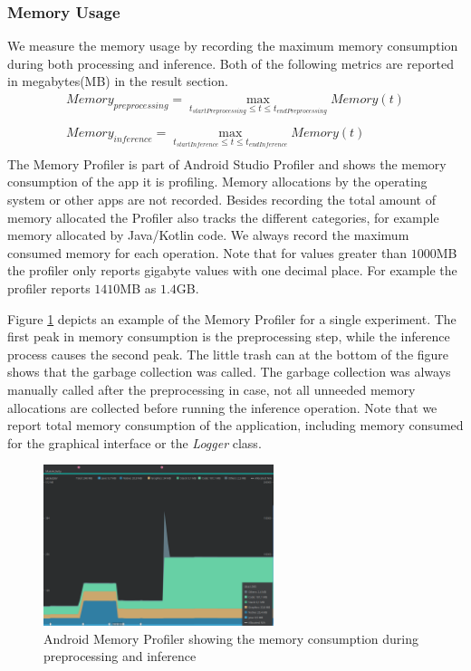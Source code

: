 \subsubsection{Memory Usage}
We measure the memory usage by recording the maximum memory consumption during both processing and inference. Both of the following metrics are reported in megabytes(MB) in the result section.
\begin{equation*}
\begin{gathered}
Memory_{preprocessing} = \max\limits_{t_{startPreprocessing} \leq t \leq t_{endPreprocessing}} Memory(t)\\\\
Memory_{inference} = \max\limits_{t_{startInference} \leq t \leq t_{endInference}} Memory(t)\\
\end{gathered}
\end{equation*}
The Memory Profiler is part of Android Studio Profiler and shows the memory consumption of the app it is profiling. Memory allocations by the operating system or other apps are not recorded. Besides recording the total amount of memory allocated the Profiler also tracks the different categories, for example memory allocated by Java/Kotlin code. We always record the maximum consumed memory for each operation.
Note that for values greater than $1000$MB the profiler only reports gigabyte values with one decimal place. For example the profiler reports $1410$MB as $1.4$GB.

Figure \ref{fig:prof_mem} depicts an example of the Memory Profiler for a single experiment. The first peak in memory consumption is the preprocessing step, while the inference process causes the second peak.
The little trash can at the bottom of the figure shows that the garbage collection was called. The garbage collection was always manually called after the preprocessing in case, not all unneeded memory allocations are collected before running the inference operation. 
Note that we report total memory consumption of the application, including memory consumed for the graphical interface or the \emph{Logger} class.
\begin{figure}[H]
\centering
\includegraphics[width=0.6\textwidth]{./Bilder/profiler_MEM}
\caption{Android Memory Profiler showing the memory consumption during preprocessing and inference}
\label{fig:prof_mem}
\end{figure}
